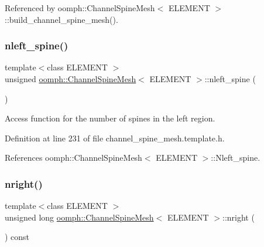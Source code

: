 Referenced by oomph\+::\+Channel\+Spine\+Mesh$<$ E\+L\+E\+M\+E\+N\+T $>$\+::build\+\_\+channel\+\_\+spine\+\_\+mesh().

\mbox{\label{classoomph_1_1ChannelSpineMesh_af5ae7133c9939b90779f0809143676bd}} 
\subsubsection{\texorpdfstring{nleft\+\_\+spine()}{nleft\_spine()}}
{\footnotesize\ttfamily template$<$class E\+L\+E\+M\+E\+NT $>$ \\
unsigned \hyperlink{classoomph_1_1ChannelSpineMesh}{oomph\+::\+Channel\+Spine\+Mesh}$<$ E\+L\+E\+M\+E\+NT $>$\+::nleft\+\_\+spine (\begin{DoxyParamCaption}{ }\end{DoxyParamCaption})\hspace{0.3cm}{\ttfamily [inline]}}



Access function for the number of spines in the left region. 



Definition at line 231 of file channel\+\_\+spine\+\_\+mesh.\+template.\+h.



References oomph\+::\+Channel\+Spine\+Mesh$<$ E\+L\+E\+M\+E\+N\+T $>$\+::\+Nleft\+\_\+spine.

\mbox{\label{classoomph_1_1ChannelSpineMesh_a559352375de869e889191d0e6c133031}} 
\subsubsection{\texorpdfstring{nright()}{nright()}}
{\footnotesize\ttfamily template$<$class E\+L\+E\+M\+E\+NT $>$ \\
unsigned long \hyperlink{classoomph_1_1ChannelSpineMesh}{oomph\+::\+Channel\+Spine\+Mesh}$<$ E\+L\+E\+M\+E\+NT $>$\+::nright (\begin{DoxyParamCaption}{ }\end{DoxyParamCaption}) const\hspace{0.3cm}{\ttfamily [inline]}}




